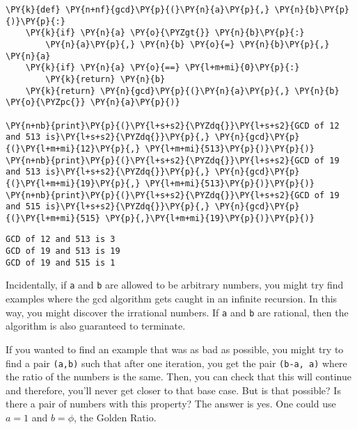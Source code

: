 \begin{Verbatim}[commandchars=\\\{\}]
\PY{k}{def} \PY{n+nf}{gcd}\PY{p}{(}\PY{n}{a}\PY{p}{,} \PY{n}{b}\PY{p}{)}\PY{p}{:}
    \PY{k}{if} \PY{n}{a} \PY{o}{\PYZgt{}} \PY{n}{b}\PY{p}{:}
        \PY{n}{a}\PY{p}{,} \PY{n}{b} \PY{o}{=} \PY{n}{b}\PY{p}{,} \PY{n}{a}
    \PY{k}{if} \PY{n}{a} \PY{o}{==} \PY{l+m+mi}{0}\PY{p}{:}
        \PY{k}{return} \PY{n}{b}
    \PY{k}{return} \PY{n}{gcd}\PY{p}{(}\PY{n}{a}\PY{p}{,} \PY{n}{b} \PY{o}{\PYZpc{}} \PY{n}{a}\PY{p}{)}

\PY{n+nb}{print}\PY{p}{(}\PY{l+s+s2}{\PYZdq{}}\PY{l+s+s2}{GCD of 12 and 513 is}\PY{l+s+s2}{\PYZdq{}}\PY{p}{,} \PY{n}{gcd}\PY{p}{(}\PY{l+m+mi}{12}\PY{p}{,} \PY{l+m+mi}{513}\PY{p}{)}\PY{p}{)}
\PY{n+nb}{print}\PY{p}{(}\PY{l+s+s2}{\PYZdq{}}\PY{l+s+s2}{GCD of 19 and 513 is}\PY{l+s+s2}{\PYZdq{}}\PY{p}{,} \PY{n}{gcd}\PY{p}{(}\PY{l+m+mi}{19}\PY{p}{,} \PY{l+m+mi}{513}\PY{p}{)}\PY{p}{)}
\PY{n+nb}{print}\PY{p}{(}\PY{l+s+s2}{\PYZdq{}}\PY{l+s+s2}{GCD of 19 and 515 is}\PY{l+s+s2}{\PYZdq{}}\PY{p}{,} \PY{n}{gcd}\PY{p}{(}\PY{l+m+mi}{515} \PY{p}{,}\PY{l+m+mi}{19}\PY{p}{)}\PY{p}{)}
\end{Verbatim}

\begin{Verbatim}
GCD of 12 and 513 is 3
GCD of 19 and 513 is 19
GCD of 19 and 515 is 1

\end{Verbatim}


Incidentally, if \texttt{a} and \texttt{b} are allowed to be arbitrary numbers, you might try find examples where the gcd algorithm gets caught in an infinite recursion.  In this way, you might discover the irrational numbers.  If \texttt{a} and \texttt{b} are rational, then the algorithm is also guaranteed to terminate.


If you wanted to find an example that was as bad as possible, you might try to find a pair \texttt{(a,b)} such that after one iteration, you get the pair \texttt{(b-a, a)} where the ratio of the numbers is the same.  Then, you can check that this will continue and therefore, you'll never get closer to that base case.  But is that possible?  Is there a pair of numbers with this property?  The answer is yes.  One could use $a = 1$ and $b = \phi$, the Golden Ratio.

